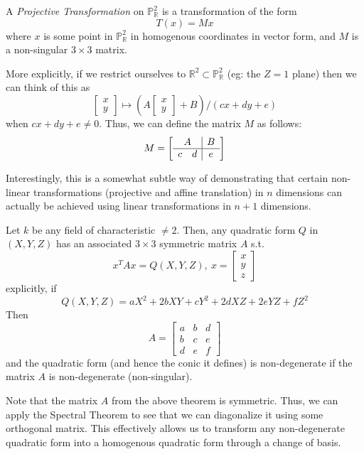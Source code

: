 \begin{mydef}
A \emph{Projective Transformation} on $\mathbb{P}^2_\mathbb{R}$ is a
transformation of the form
\[
T(x) = Mx
\]
where $x$ is some point in $\mathbb{P}^2_\mathbb{R}$ in homogenous coordinates in vector form,
and $M$ is a non-singular $3\times3$ matrix.
\end{mydef}

More explicitly, if we restrict ourselves to $\mathbb{R}^2 \subset \mathbb{P}^2_\mathbb{R}$
(eg: the $Z=1$ plane) then we can think of this as
\[
\begin{bmatrix}
x\\
y
\end{bmatrix} \mapsto
(A\begin{bmatrix}
x\\
y
\end{bmatrix} + B) / (cx+dy+e)
\]
when $cx+dy+e \ne 0$. Thus, we can define the matrix $M$ as follows:
\[
M= \left[\begin{array}{cc|c}
\multicolumn{2}{c|}{A} & B\\
\hline
c & d & e
\end{array}\right]
\]

Interestingly, this is a somewhat subtle way of demonstrating that certain
non-linear transformations (projective and affine translation) in $n$
dimensions can actually be achieved using linear transformations in $n+1$ dimensions.

\begin{theorem}
Let $k$ be any field of characteristic $\ne 2$. Then, any quadratic form $Q$
in $(X,Y,Z)$ has an associated $3 \times 3$ symmetric matrix $A$ s.t.
\[
x^TAx =  Q(X,Y,Z),~x=\begin{bmatrix}
x\\
y\\
z
\end{bmatrix}
\]
explicitly, if 
\[
Q(X,Y,Z) = aX^2 + 2bXY + cY^2 + 2dXZ + 2eYZ + fZ^2
\]
Then
\[
A = \begin{bmatrix}
a & b & d\\
b & c & e\\
d & e & f
\end{bmatrix}
\]
and the quadratic form (and hence the conic it defines) is non-degenerate
if the matrix $A$ is non-degenerate (non-singular).
\end{theorem}

Note that the matrix $A$ from the above theorem is symmetric. Thus, we can
apply the Spectral Theorem to see that we can diagonalize it using some
orthogonal matrix. This effectively allows us to transform any non-degenerate 
quadratic form into a homogenous quadratic form through a change of basis.

